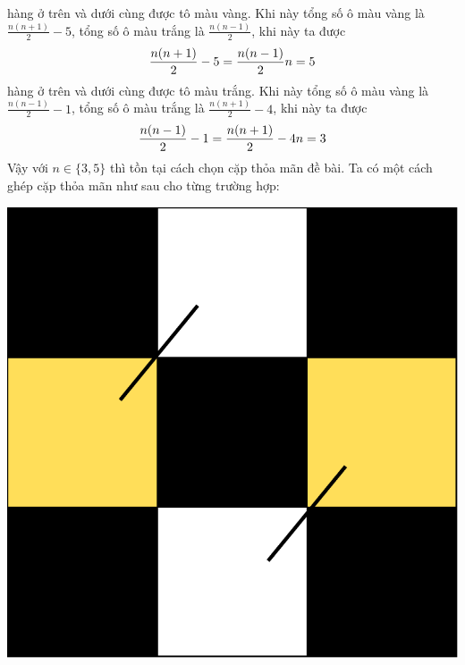 \documentclass[11pt]{scrartcl}
\begin{document}
\begin{itemize}[label=, leftmargin=0em, itemsep=0.5em]
\begin{sol}
         hàng ở trên và dưới cùng được tô màu vàng.  Khi này tổng số ô màu vàng là $\frac{n(n + 1)}{2} - 5$, tổng số ô màu trắng là $\frac{n(n - 1)}{2}$, khi này ta được 
        \[
            \frac{n(n + 1)}{2} - 5 = \frac{n(n - 1)}{2} \lra n = 5
        \]
         hàng ở trên và dưới cùng được tô màu trắng. Khi này tổng số ô màu vàng là $\frac{n(n - 1)}{2} - 1$, tổng số ô màu trắng là $\frac{n(n + 1)}{2} - 4$, khi này ta được 
        \[
            \frac{n(n - 1)}{2} - 1 = \frac{n(n + 1)}{2} - 4 \ra n = 3
        \]
        Vậy với $n \in \{3,5\}$ thì tồn tại cách chọn cặp thỏa mãn đề bài. Ta có một cách ghép cặp thỏa mãn như sau cho từng trường hợp:
        \begin{center}
            \includegraphics[scale=0.3]{Image/P1.3.pdf}
            \hspace{1cm}

\end{center}
\end{sol}
\end{itemize}
\end{document}
